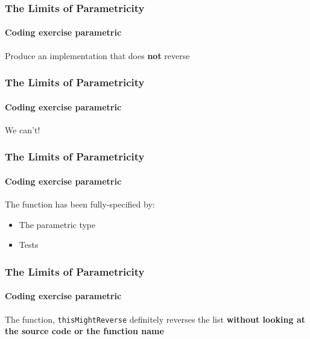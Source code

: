 \begin{frame}[fragile]
\frametitle{The Limits of Parametricity}
\framesubtitle{Coding exercise \textemdash parametric}
\begin{block}{Produce an implementation that does \textbf{not} reverse}

\end{block}
\end{frame}

\begin{frame}[fragile]
\frametitle{The Limits of Parametricity}
\framesubtitle{Coding exercise \textemdash parametric}
\begin{center}
We can't!
\end{center}
\end{frame}

\begin{frame}[fragile]
\frametitle{The Limits of Parametricity}
\framesubtitle{Coding exercise \textemdash parametric}
\begin{block}{The function has been fully-specified by:}
\begin{itemize}
  \item The parametric type
  \item Tests
\end{itemize}
\end{block}
\end{frame}

\begin{frame}[fragile]
\frametitle{The Limits of Parametricity}
\framesubtitle{Coding exercise \textemdash parametric}
\begin{center}
The function, \lstinline{thisMightReverse} definitely reverses the list \textbf{without looking at the source code or the function name}
\end{center}
\end{frame}